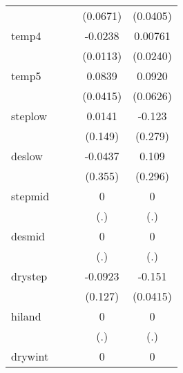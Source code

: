 {\begin{tabular}{l*{4}{c}}
            &                     &                     &    (0.0671)         &    (0.0405)         \\
[1em]
temp4       &                     &                     &     -0.0238         &     0.00761         \\
            &                     &                     &    (0.0113)         &    (0.0240)         \\
[1em]
temp5       &                     &                     &      0.0839         &      0.0920         \\
            &                     &                     &    (0.0415)         &    (0.0626)         \\
[1em]
steplow     &                     &                     &      0.0141         &      -0.123         \\
            &                     &                     &     (0.149)         &     (0.279)         \\
[1em]
deslow      &                     &                     &     -0.0437         &       0.109         \\
            &                     &                     &     (0.355)         &     (0.296)         \\
[1em]
stepmid     &                     &                     &           0         &           0         \\
            &                     &                     &         (.)         &         (.)         \\
[1em]
desmid      &                     &                     &           0         &           0         \\
            &                     &                     &         (.)         &         (.)         \\
[1em]
drystep     &                     &                     &     -0.0923         &      -0.151\sym{**} \\
            &                     &                     &     (0.127)         &    (0.0415)         \\
[1em]
hiland      &                     &                     &           0         &           0         \\
            &                     &                     &         (.)         &         (.)         \\
[1em]
drywint     &                     &                     &           0         &           0         \\

\end{tabular}}
